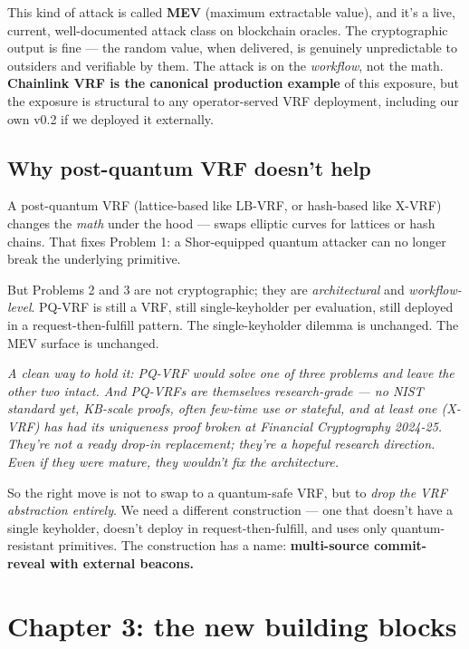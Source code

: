 \documentclass[11pt]{article}
\newenvironment{aside}{\par\medskip\noindent\itshape\small\color{black!70}}{\normalfont\par\medskip}
\begin{document}
This kind of attack is called \textbf{MEV} (maximum extractable value), and it's a live, current, well-documented attack class on blockchain oracles. The cryptographic output is fine --- the random value, when delivered, is genuinely unpredictable to outsiders and verifiable by them. The attack is on the \emph{workflow}, not the math. \textbf{Chainlink VRF is the canonical production example} of this exposure, but the exposure is structural to any operator-served VRF deployment, including our own v0.2 if we deployed it externally.

\subsection*{Why post-quantum VRF doesn't help}

A post-quantum VRF (lattice-based like LB-VRF, or hash-based like X-VRF) changes the \emph{math} under the hood --- swaps elliptic curves for lattices or hash chains. That fixes Problem 1: a Shor-equipped quantum attacker can no longer break the underlying primitive.

But Problems 2 and 3 are not cryptographic; they are \emph{architectural} and \emph{workflow-level}. PQ-VRF is still a VRF, still single-keyholder per evaluation, still deployed in a request-then-fulfill pattern. The single-keyholder dilemma is unchanged. The MEV surface is unchanged.

\begin{aside}
A clean way to hold it: PQ-VRF would solve one of three problems and leave the other two intact. And PQ-VRFs are themselves research-grade --- no NIST standard yet, KB-scale proofs, often few-time use or stateful, and at least one (X-VRF) has had its uniqueness proof broken at Financial Cryptography 2024-25. They're not a ready drop-in replacement; they're a hopeful research direction. Even if they were mature, they wouldn't fix the architecture.
\end{aside}

So the right move is not to swap to a quantum-safe VRF, but to \emph{drop the VRF abstraction entirely}. We need a different construction --- one that doesn't have a single keyholder, doesn't deploy in request-then-fulfill, and uses only quantum-resistant primitives. The construction has a name: \textbf{multi-source commit-reveal with external beacons.}

\section{Chapter 3: the new building blocks}
\end{document}
